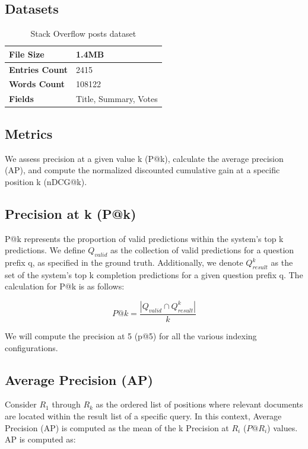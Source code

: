 {\subsection{Datasets}


\begin{table}[ht] 
{\footnotesize
\begin{tabular}{ P{3cm} ||P{10.1cm}  }      %
 \hline \hline
\textbf{File Size} & 1.4MB \T\B 
\\ 
\hline
\textbf{Entries Count} & 2415\T\B 
\\ 
\hline
\textbf{Words Count} & 108122\T\B 
\\ 
\hline
\textbf{Fields} & Title, Summary, Votes\T\B 
\\ 
\hline \hline
    \end{tabular}
}
  \captionsetup{justification=centering,margin=2cm}
  \caption{Stack Overflow posts dataset}
    \label{table:indexer_dataset}
\end{table}

\subsection{Metrics}
We assess precision at a given value k (P@k), calculate the average precision (AP), and compute the normalized discounted cumulative gain at a specific position k (nDCG@k).

\subsection*{Precision at k (P@k)}
P@k represents the proportion of valid predictions within the system's top k predictions. We define $Q_{valid}$ as the collection of valid predictions for a question prefix q, as specified in the ground truth. Additionally, we denote $Q^k_{result}$ as the set of the system's top k completion predictions for a given question prefix q. The calculation for P@k is as follows:

\begin{equation}
P@k = \frac{|Q_{valid} \cap Q^k_{result}|}{k}
\label{eq:depth}
\end{equation}

We will compute the precision at 5 (p@5) for all the various indexing configurations.

\subsection*{Average Precision (AP)}
Consider $R_1$ through $R_k $ as the ordered list of positions where relevant documents are located within the result list of a specific query. In this context, Average Precision (AP) is computed as the mean of the k Precision at $R_i$ ($P@R_i$) values. AP is computed as:

}
